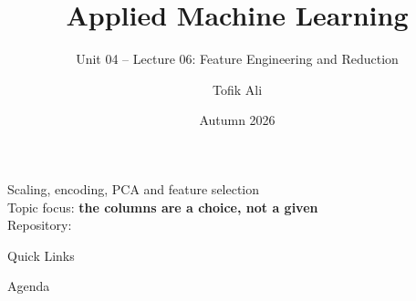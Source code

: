 \documentclass[aspectratio=169]{beamer}
\title[Applied Machine Learning]{Applied Machine Learning}
\subtitle{Unit 04 -- Lecture 06: Feature Engineering and Reduction}
\author{Tofik Ali}
\institute{School of Computer Science, UPES Dehradun}
\date{Autumn 2026}
\begin{document}
\UPESCoverFrame
\setcounter{framenumber}{0}

\begin{frame}
  \titlepage
  \begin{center}
    \footnotesize Scaling, encoding, PCA and feature selection\\[0.25em]
    \footnotesize Topic focus: \textbf{the columns are a choice, not a
    given}\\[0.25em]
    \footnotesize Repository: \texttt{\AMLRepoURL}
  \end{center}
  \slidesources{\AMLUnitIVSources}
\end{frame}

\begin{frame}{Quick Links}
  \centering
  \hyperlink{sec:fe}{}\hspace{0.4em}
  \hyperlink{sec:scale}{}\hspace{0.4em}
  \hyperlink{sec:encode}{}\hspace{0.4em}
  \hyperlink{sec:reduce}{}\hspace{0.4em}
  \hyperlink{sec:pca}{}\hspace{0.4em}
  \hyperlink{sec:select}{}\hspace{0.4em}
  \hyperlink{sec:summary}{}
\end{frame}

\begin{frame}{Agenda}
  \tableofcontents
\end{frame}
\end{document}

